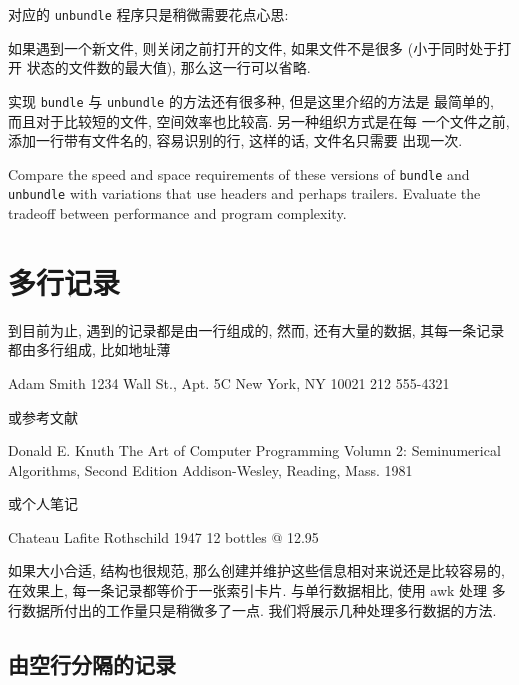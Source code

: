 \begin{shell}
对应的 \verb'unbundle' 程序只是稍微需要花点心思:
如果遇到一个新文件, 则关闭之前打开的文件, 如果文件不是很多 (小于同时处于打开
状态的文件数的最大值), 那么这一行可以省略.

实现 \verb'bundle' 与 \verb'unbundle' 的方法还有很多种, 但是这里介绍的方法是
最简单的, 而且对于比较短的文件, 空间效率也比较高. 另一种组织方式是在每
一个文件之前, 添加一行带有文件名的, 容易识别的行, 这样的话, 文件名只需要
出现一次.

\begin{exercise}
    Compare the speed and space requirements of these versions of
    \verb'bundle' and \verb'unbundle' with variations that use headers and
    perhaps trailers. Evaluate the tradeoff between performance and program
    complexity.
\end{exercise}

\section{多行记录}
\label{sec:multiline_records}

到目前为止, 遇到的记录都是由一行组成的, 然而, 还有大量的数据, 其每一条记录
都由多行组成, 比如地址薄
\begin{shell}
    Adam Smith
    1234 Wall St., Apt. 5C
    New York, NY 10021
    212 555-4321
\end{shell}
或参考文献
\begin{shell}
    Donald E. Knuth
    The Art of Computer Programming
    Volumn 2: Seminumerical Algorithms, Second Edition
    Addison-Wesley, Reading, Mass.
    1981
\end{shell}
或个人笔记
\begin{shell}
    Chateau Lafite Rothschild 1947
    12 bottles @ 12.95
\end{shell}

如果大小合适, 结构也很规范, 那么创建并维护这些信息相对来说还是比较容易的,
在效果上, 每一条记录都等价于一张索引卡片. 与单行数据相比, 使用 awk 处理 
多行数据所付出的工作量只是稍微多了一点. 我们将展示几种处理多行数据的方法.

\subsection{由空行分隔的记录}
\label{subsec:records_separated_by_blank_lines}


\end{shell}
